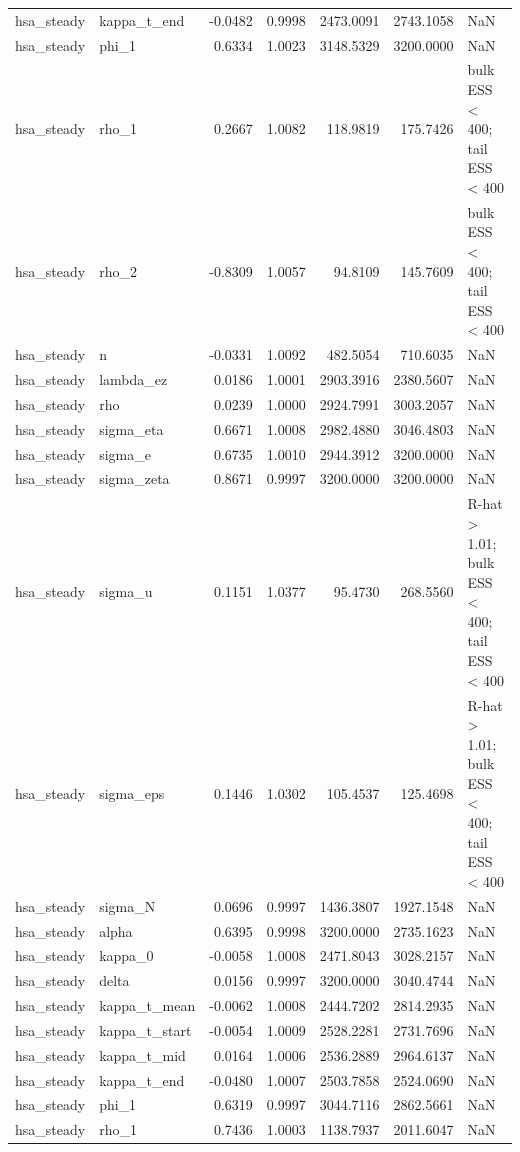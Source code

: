 \begin{tabular}{llrrrrl}
hsa\_steady & kappa\_t\_end & -0.0482 & 0.9998 & 2473.0091 & 2743.1058 & NaN \\
hsa\_steady & phi\_1 & 0.6334 & 1.0023 & 3148.5329 & 3200.0000 & NaN \\
hsa\_steady & rho\_1 & 0.2667 & 1.0082 & 118.9819 & 175.7426 & bulk ESS < 400; tail ESS < 400 \\
hsa\_steady & rho\_2 & -0.8309 & 1.0057 & 94.8109 & 145.7609 & bulk ESS < 400; tail ESS < 400 \\
hsa\_steady & n & -0.0331 & 1.0092 & 482.5054 & 710.6035 & NaN \\
hsa\_steady & lambda\_ez & 0.0186 & 1.0001 & 2903.3916 & 2380.5607 & NaN \\
hsa\_steady & rho & 0.0239 & 1.0000 & 2924.7991 & 3003.2057 & NaN \\
hsa\_steady & sigma\_eta & 0.6671 & 1.0008 & 2982.4880 & 3046.4803 & NaN \\
hsa\_steady & sigma\_e & 0.6735 & 1.0010 & 2944.3912 & 3200.0000 & NaN \\
hsa\_steady & sigma\_zeta & 0.8671 & 0.9997 & 3200.0000 & 3200.0000 & NaN \\
hsa\_steady & sigma\_u & 0.1151 & 1.0377 & 95.4730 & 268.5560 & R-hat > 1.01; bulk ESS < 400; tail ESS < 400 \\
hsa\_steady & sigma\_eps & 0.1446 & 1.0302 & 105.4537 & 125.4698 & R-hat > 1.01; bulk ESS < 400; tail ESS < 400 \\
hsa\_steady & sigma\_N & 0.0696 & 0.9997 & 1436.3807 & 1927.1548 & NaN \\
hsa\_steady & alpha & 0.6395 & 0.9998 & 3200.0000 & 2735.1623 & NaN \\
hsa\_steady & kappa\_0 & -0.0058 & 1.0008 & 2471.8043 & 3028.2157 & NaN \\
hsa\_steady & delta & 0.0156 & 0.9997 & 3200.0000 & 3040.4744 & NaN \\
hsa\_steady & kappa\_t\_mean & -0.0062 & 1.0008 & 2444.7202 & 2814.2935 & NaN \\
hsa\_steady & kappa\_t\_start & -0.0054 & 1.0009 & 2528.2281 & 2731.7696 & NaN \\
hsa\_steady & kappa\_t\_mid & 0.0164 & 1.0006 & 2536.2889 & 2964.6137 & NaN \\
hsa\_steady & kappa\_t\_end & -0.0480 & 1.0007 & 2503.7858 & 2524.0690 & NaN \\
hsa\_steady & phi\_1 & 0.6319 & 0.9997 & 3044.7116 & 2862.5661 & NaN \\
hsa\_steady & rho\_1 & 0.7436 & 1.0003 & 1138.7937 & 2011.6047 & NaN \\

\end{tabular}
